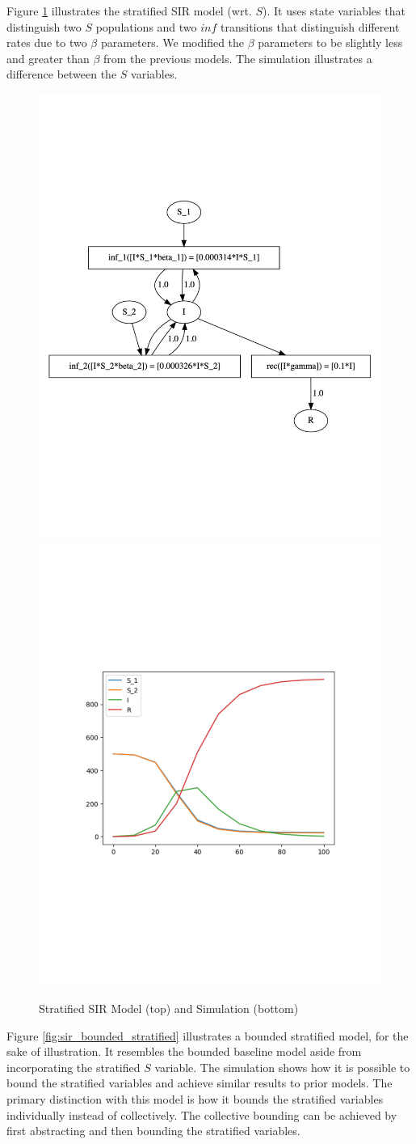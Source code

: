 Figure \ref{fig:sir_stratified} illustrates the stratified SIR model (wrt. $S$).  It uses state variables that distinguish two $S$ populations and two $inf$ transitions that distinguish different rates due to two $\beta$ parameters.  We modified the $\beta$ parameters to be slightly less and greater than $\beta$ from the previous models.  The simulation illustrates a difference between the $S$ variables.

\begin{figure}[t]
    \centering
    \includegraphics[width=0.5\linewidth,clip]{fig/sir/sir_stratified_model.pdf}
    \includegraphics[width=0.4\linewidth,clip]{fig/sir/sir_stratified_sim.pdf}
    \caption{\label{fig:sir_stratified} Stratified SIR Model (top) and Simulation (bottom)}
\end{figure}

Figure \ref{fig:sir_bounded_stratified} illustrates a bounded stratified model, for the sake of illustration.  It resembles the bounded baseline model aside from incorporating the stratified $S$ variable.  The simulation shows how it is possible to bound the stratified variables and achieve similar results to prior models. The primary distinction with this model is how it bounds the stratified variables individually instead of collectively.  The collective bounding can be achieved by first abstracting and then bounding the stratified variables.

